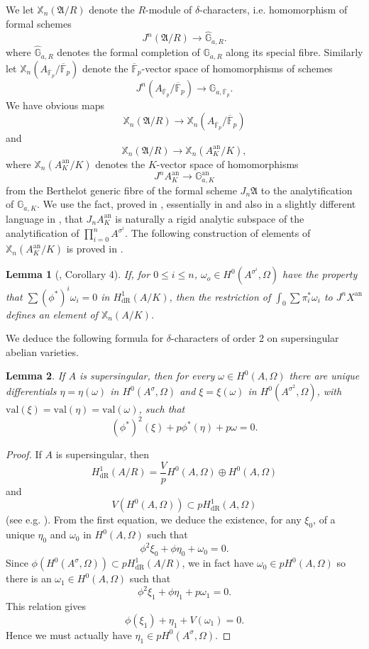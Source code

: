 \documentclass[11pt]{amsart}
\newcommand{\dR}{\mathrm{dR}}
\newcommand{\an}{\mathrm{an}}
\newcommand{\val}{\mathrm{val}}
\theoremstyle{plain}
\newtheorem{lemma}{Lemma}
\theoremstyle{definition}
\newcommand{\F}{\mathbb{F}}
\begin{document}
We let $\mathbb{X}_n (\mathfrak{A}/R)$ denote the $R$-module of $\delta$-characters, i.e. homomorphism of formal schemes
\[
J^n  (\mathfrak{A}/R)\to \widehat{\mathbb{G}}_{a,R}.
\]
where $\widehat{\mathbb{G}}_{a,R}$ denotes the formal completion of $\mathbb{G}_{a,R}$ along its special fibre. 
Similarly let $\mathbb{X}_n (A_{\overline{\F }_p }/\overline{\F }_p )$ denote the $\overline{\F }_p $-vector space of homomorphisms of schemes
\[
J^n  (A_{\overline{\F }_p }/\overline{\F  }_p )\to \mathbb{G}_{a,\overline{\F }_p }.
\]
We have obvious maps
\[
\mathbb{X}_n (\mathfrak{A}/R)\to \mathbb{X}_n (A_{\overline{\F }_p }/\overline{\F }_p )
\]
and
\[
\mathbb{X}_n (\mathfrak{A}/R)\to \mathbb{X}_n (A_K ^{\an } /K ),
\]
where $\mathbb{X}_n (A_K ^{\an } /K)$ denotes the $K$-vector space of homomorphisms
\[
J^n A_K ^{\an} \to \mathbb{G}_{a,K}^{\an }
\]
from the Berthelot generic fibre of the formal scheme $J_n \mathfrak{A}$ to the analytification of $\mathbb{G}_{a,K}$. We use the fact, proved in \cite{bor2}, essentially in \cite{buium:95} and also in a slightly different language in \cite{DS26}, that $J_n A_K ^{\an }$ is naturally a rigid analytic subspace of the analytification of $\prod _{i=0}^n A^{\sigma ^i }$. The following construction of elements of $\mathbb{X}_n (A_K ^{\an } /K)$ is proved in \cite{DS26}.
\begin{lemma}[\cite{DS26}, Corollary 4]
If, for $0\leq i\leq n$, $\omega _o \in H^0 (A^{\sigma ^i },\Omega )$ have the property that $\sum (\phi ^* )^i \omega _i =0$ in $H^1 _{\dR}(A/K)$, then the restriction of $\int _0 \sum \pi _i ^* \omega _i $ to $J^n X^{\an }$ defines an element of $\mathbb{X}_n (A/K)$.
\end{lemma}
We deduce the following formula for $\delta $-characters of order 2 on supersingular abelian varieties.
\begin{lemma}
If $A$ is supersingular, then for every $\omega \in H^0 (A,\Omega )$ there are unique differentials $\eta =\eta (\omega )$ in $H^0 (A^{\sigma },\Omega )$ and $\xi = \xi (\omega )$ in $H^0 (A^{\sigma ^2 },\Omega )$, with $\val (\xi )=\val (\eta )=\val (\omega )$, such that 
\[
(\phi ^* )^2 (\xi ) +p\phi ^* (\eta ) +p\omega =0.
\]
\end{lemma}
\begin{proof}
If $A$ is supersingular, then 
\[
H^1 _{\dR}(A/R)=\frac{V}{p}H^0 (A,\Omega )\oplus H^0 (A,\Omega )
\]
and 
\[
V(H^0 (A,\Omega ))\subset pH^1 _{\dR}(A,\Omega )
\]
(see e.g. \cite{coleman:ramified}).
From the first equation, we deduce the existence, for any $\xi _0 $, of a unique $\eta  _0$ and $\omega _0$ in $H^0 (A,\Omega )$ such that
\[
\phi ^2 \xi _0 +\phi \eta _0 +\omega _0 =0.
\]
Since $\phi (H^0 (A^{\sigma },\Omega ))\subset pH^1 _{\dR}(A/R)$, we in fact have $\omega _0 \in pH^0 (A,\Omega )$ so there is an $\omega _1 \in H^0 (A,\Omega )$ such that
\[
\phi ^2 \xi _1 +\phi \eta _1 +p\omega _1 =0.
\]
This relation gives
\[
\phi (\xi _1 )+\eta _1 +V(\omega _1 )=0.
\]
Hence we must actually have $\eta _1 \in pH^0 (A^{\sigma },\Omega )$.
\end{proof}
\end{document}
